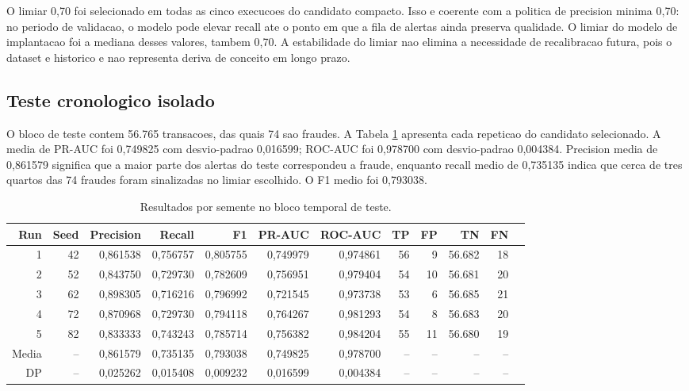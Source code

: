 \documentclass[10pt,twocolumn]{article}
\begin{document}
O limiar 0,70 foi selecionado em todas as cinco execucoes do candidato compacto. Isso e coerente com a politica de precision minima 0,70: no periodo de validacao, o modelo pode elevar recall ate o ponto em que a fila de alertas ainda preserva qualidade. O limiar do modelo de implantacao foi a mediana desses valores, tambem 0,70. A estabilidade do limiar nao elimina a necessidade de recalibracao futura, pois o dataset e historico e nao representa deriva de conceito em longo prazo.

\begin{center}
\end{center}

\subsection{Teste cronologico isolado}

O bloco de teste contem 56.765 transacoes, das quais 74 sao fraudes. A Tabela \ref{tab:test} apresenta cada repeticao do candidato selecionado. A media de PR-AUC foi 0,749825 com desvio-padrao 0,016599; ROC-AUC foi 0,978700 com desvio-padrao 0,004384. Precision media de 0,861579 significa que a maior parte dos alertas do teste correspondeu a fraude, enquanto recall medio de 0,735135 indica que cerca de tres quartos das 74 fraudes foram sinalizadas no limiar escolhido. O F1 medio foi 0,793038.

\begin{table}[t]
\centering
\caption{Resultados por semente no bloco temporal de teste.}
\label{tab:test}
\begin{tabular}{rrrrrrrrrrrr}
\toprule
Run & Seed & Precision & Recall & F1 & PR-AUC & ROC-AUC & TP & FP & TN & FN \\
\midrule
1 & 42 & 0,861538 & 0,756757 & 0,805755 & 0,749979 & 0,974861 & 56 & 9 & 56.682 & 18 \\
2 & 52 & 0,843750 & 0,729730 & 0,782609 & 0,756951 & 0,979404 & 54 & 10 & 56.681 & 20 \\
3 & 62 & 0,898305 & 0,716216 & 0,796992 & 0,721545 & 0,973738 & 53 & 6 & 56.685 & 21 \\
4 & 72 & 0,870968 & 0,729730 & 0,794118 & 0,764267 & 0,981293 & 54 & 8 & 56.683 & 20 \\
5 & 82 & 0,833333 & 0,743243 & 0,785714 & 0,756382 & 0,984204 & 55 & 11 & 56.680 & 19 \\
\midrule
Media & -- & 0,861579 & 0,735135 & 0,793038 & 0,749825 & 0,978700 & -- & -- & -- & -- \\
DP & -- & 0,025262 & 0,015408 & 0,009232 & 0,016599 & 0,004384 & -- & -- & -- & -- \\
\bottomrule
\end{tabular}
\end{table}
\end{document}
